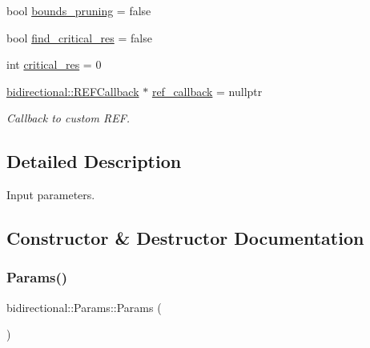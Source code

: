 \begin{DoxyCompactItemize}
bool \hyperlink{classbidirectional_1_1Params_a1a452cc4956571752b946165a899f850}{bounds\+\_\+pruning} = false
\item 
bool \hyperlink{classbidirectional_1_1Params_aafe66809d74beb22c445a72ca7955f85}{find\+\_\+critical\+\_\+res} = false
\item 
int \hyperlink{classbidirectional_1_1Params_a7d318c4af901a82c3f566d59c6de1b62}{critical\+\_\+res} = 0
\item 
\hyperlink{classbidirectional_1_1REFCallback}{bidirectional\+::\+R\+E\+F\+Callback} $\ast$ \hyperlink{classbidirectional_1_1Params_afa96dcebb31c930ea4bd339fc72779a5}{ref\+\_\+callback} = nullptr
\begin{DoxyCompactList}\small\item\em Callback to custom R\+EF. \end{DoxyCompactList}\end{DoxyCompactItemize}


\subsection{Detailed Description}
Input parameters. 

\subsection{Constructor \& Destructor Documentation}
\mbox{\label{classbidirectional_1_1Params_a4873db87f0c812884543365b3a075de2}} 
\subsubsection{\texorpdfstring{Params()}{Params()}}
{\footnotesize\ttfamily bidirectional\+::\+Params\+::\+Params (\begin{DoxyParamCaption}{ }\end{DoxyParamCaption})\hspace{0.3cm}{\ttfamily [inline]}}

\mbox{\label{classbidirectional_1_1Params_a2f4b540e09b10800d412da8af5ddfb2a}} 
